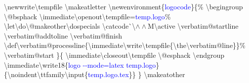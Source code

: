 \resetlinenumber
\begin{linenumbers}\linespread{1}\ttfamily
\textbackslash newwrite\textbackslash tempf{}ile\newline
\textbackslash makeatletter\newline
\textbackslash newenvironment\{\textcolor{blue}{logocode}\}\{\%\newline
\hspace*{1.2em}\textbackslash begingroup\newline
\hspace*{1.2em}\textbackslash @bsphack\newline
\hspace*{1.2em}\textbackslash immediate\textbackslash openout\textbackslash tempf{}ile=\textcolor{blue}{temp.logo}\%\newline
\hspace*{1.2em}\textbackslash let\textbackslash do\textbackslash @makeother\textbackslash dospecials\newline
\hspace*{1.2em}\textbackslash catcode\`{}\textbackslash$\wedge\wedge$M\textbackslash active\newline
\hspace*{1.2em}\textbackslash verbatim@startline\newline
\hspace*{1.2em}\textbackslash verbatim@addtoline\newline
\hspace*{1.2em}\textbackslash verbatim@f{}inish\newline
\hspace*{1.2em}\textbackslash def\textbackslash verbatim@processline\{\textbackslash immediate\textbackslash write\textbackslash tempf{}ile\{\textbackslash the\textbackslash verbatim@line\}\}\%\newline
\hspace*{1.2em}\textbackslash verbatim@start\newline
\}\{\newline
\hspace*{1.2em}\textbackslash immediate\textbackslash closeout\textbackslash tempf{}ile\newline
\hspace*{1.2em}\textbackslash @esphack\newline
\hspace*{1.2em}\textbackslash endgroup\newline
\hspace*{1.2em}\textbackslash immediate\textbackslash write18\{\textcolor{blue}{logo -{}-mode=latex temp.logo}\}\newline
\hspace*{1.2em}\{\textbackslash noindent\textbackslash ttfamily\textbackslash input\{\textcolor{blue}{temp.logo.tex}\}\}\newline
\}\newline
\textbackslash makeatother
\end{linenumbers}

